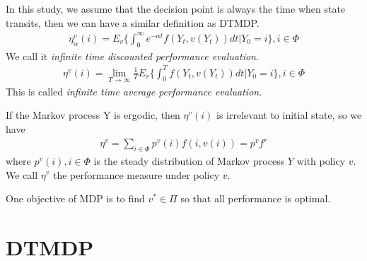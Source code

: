\documentclass[runningheads]{llncs}
\begin{document}
    \par
    In this study, we assume that the decision point is always the time when state transits,
    then we can have a similar definition as DTMDP.
    \begin{align}
        \eta_\alpha^v(i) = E_v \{ \int_{0}^\infty e^{-\alpha t} f(Y_t, v(Y_t)) dt | Y_0 = i \}, i \in \Phi
    \end{align}
    We call it \emph{infinite time
    discounted performance evaluation}.
    \begin{align}
        \eta^v(i) = \mathop{\lim}_{T\rightarrow\infty} \frac{1}{T} E_v \{ \int_{0}^{T} f(Y_t, v(Y_t)) dt | Y_0 = i \}, i \in \Phi
    \end{align}
    This is called \emph{infinite time average performance evaluation}.
    \par
    If the Markov process Y is ergodic, then $\eta^v(i)$ is irrelevant to
    initial state, so we have
    \begin{align}
        \eta^v = \sum_{i \in \Phi} p^v (i) f(i, v(i)) = p^v f^v
    \end{align}
    where $p^v(i), i \in \Phi$ is the steady distribution of Markov process $Y$
    with policy $v$. We call $\eta^v$
    the performance measure under policy $v$.
    \par
    One objective of MDP is to find $v^* \in \Pi$ so that all performance is optimal.

    \section{DTMDP}
\end{document}
